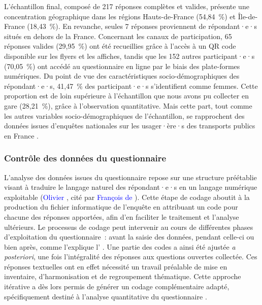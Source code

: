 \begin{refsegment}
L’échantillon final, composé de 217 réponses complètes et valides, présente une concentration géographique dans les régions Hauts-de-France (54,84~\%) et Île-de-France (18,43~\%). En revanche, seules 7 réponses proviennent de répondant·e·s situés en dehors de la France. Concernant les canaux de participation, 65 réponses valides (29,95~\%) ont été recueillies grâce à l'accès à un QR code disponible sur les flyers et les affiches, tandis que les 152 autres participant·e·s (70,05~\%) ont accédé au questionnaire en ligne par le biais des plate-formes numériques. Du point de vue des caractéristiques socio-démographiques des répondant·e·s, 41,47~\% des participant·e·s s’identifient comme femmes. Cette proportion est de loin supérieure à l'échantillon que nous avons pu collecter en gare (28,21~\%), grâce à l'observation quantitative. Mais cette part, tout comme les autres variables socio-démographiques de l'échantillon, se rapprochent des données issues d’enquêtes nationales sur les usager·ère·s des transports publics en France  \textcolor{blue}{\autocite[]{enov_enquete_2021}}.%

\subsubsection*{Contrôle des données du questionnaire
    \label{chap3:administration-questionnaire-usagers-validation}
    }

L’analyse des données issues du questionnaire repose sur une structure préétablie visant à traduire le langage naturel des répondant·e·s en un langage numérique exploitable (\textcolor{blue}{Olivier} \textcolor{blue}{\textcite[49-62]{martin_analyse_2020}}, cité par \textcolor{blue}{François de} \textcolor{blue}{\textcite[89]{singly_questionnaire_2016}}). Cette étape de codage aboutit à la production du fichier informatique de l’enquête en attribuant un code pour chacune des réponses apportées, afin d’en faciliter le traitement et l’analyse ultérieurs. Le processus de codage peut intervenir au cours de différentes phases d'exploitation du questionnaire~: avant la saisie des données, pendant celle-ci ou bien après, comme l'explique l' \textcolor{blue}{\textcite{ined_saisie_nodate}}. Une partie des codes a ainsi été ajustée \textsl{a posteriori}, une fois l’intégralité des réponses aux questions ouvertes collectée. Ces réponses textuelles ont en effet nécessité un travail préalable de mise en inventaire, d’harmonisation et de regroupement thématique. Cette approche itérative a dès lors permis de générer un codage complémentaire adapté, spécifiquement destiné à l’analyse quantitative du questionnaire \textcolor{blue}{\autocite[89]{singly_questionnaire_2016}}.%


\end{refsegment}
